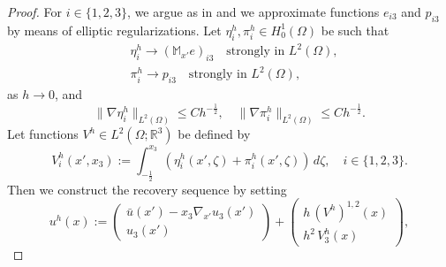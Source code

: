 \documentclass[reqno,10pt]{amsart}
\numberwithin{equation}{section}
\theoremstyle{remark}
\newcommand{\M}{\mathbb{M}}
\newcommand{\R}{\mathbb{R}}
\DeclareMathOperator{\sym}{sym}
\newcommand{\strong}{\to}
\newcommand{\E}{{\bf E}}
\begin{document}
\begin{proof}
For $i \in \{1, 2, 3\}$, we argue as in \cite[Proposition 4.1]{Liero.Mielke.2011} and we approximate functions $e_{i3}$ and $p_{i3}$ by means of elliptic regularizations. 
Let $\eta^h_i, \pi^h_i \in H^1_0(\Omega)$ be such that
\begin{align}
	& \eta^h_i \strong (\M_{x'} e)_{i3}\quad \text{strongly in $L^2(\Omega)$}, \label{elliptic regularizations convergence e}\\ 
	& \pi^h_i \strong p_{i3}\quad \text{strongly in $L^2(\Omega)$}, \label{elliptic regularizations convergence p}
\end{align}
as $h \to 0$, and
\begin{equation} \label{elliptic regularizations bounds}
	\|\nabla \eta^h_i\|_{L^2(\Omega)} \leq C h^{-\frac{1}{2}}, \quad \|\nabla \pi^h_i\|_{L^2(\Omega)} \leq C h^{-\frac{1}{2}}.
\end{equation}
Let functions $V^h \in L^2(\Omega;\R^3)$ be defined by
\begin{equation*}
	V^h_i(x',x_3) := \int_{-\frac{1}{2}}^{x_3} \left( \eta^h_i(x',\zeta) + \pi^h_i(x',\zeta) \right) \,d\zeta, \quad i \in \{1, 2, 3\}.
\end{equation*}
Then we construct the recovery sequence by setting
\begin{equation*}
	u^h(x) := \left(\begin{array}{c} \bar{u}(x') - x_3 \nabla_{x'} u_3(x') \\ u_3(x') \end{array}\right) + \left(\begin{array}{c} h\,(V^h)^{1,2}(x) \\ h^2\,V^h_3(x) \end{array}\right),
\end{equation*}

\end{proof}
\end{document}
